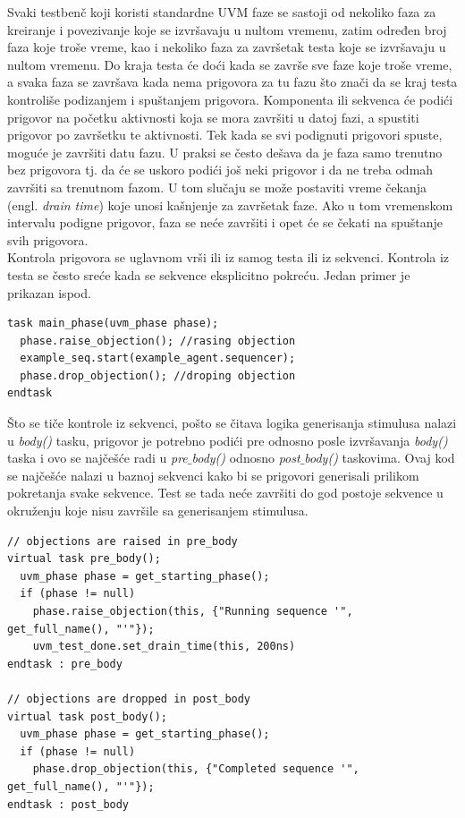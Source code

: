 Svaki testbenč koji koristi standardne UVM faze se sastoji od nekoliko faza za
kreiranje i povezivanje koje se izvršavaju u nultom vremenu, zatim određen broj
faza koje troše vreme, kao i nekoliko faza za završetak testa koje se izvršavaju
u nultom vremenu. Do kraja testa će doći kada se završe sve faze koje troše
vreme, a svaka faza se završava kada nema prigovora za tu fazu što znači da se
kraj testa kontroliše podizanjem i spuštanjem prigovora. Komponenta ili sekvenca
će podići prigovor na početku aktivnosti koja se mora završiti u datoj fazi, a
spustiti prigovor po završetku te aktivnosti. Tek kada se svi podignuti
prigovori spuste, moguće je završiti datu fazu. U praksi se često dešava da je
faza samo trenutno bez prigovora tj. da će se uskoro podići još neki prigovor i
da ne treba odmah završiti sa trenutnom fazom. U tom slučaju se može postaviti
vreme čekanja (engl. \emph{drain time}) koje unosi kašnjenje za završetak faze.
Ako u tom vremenskom intervalu podigne prigovor, faza se neće završiti i opet će
se čekati na spuštanje svih prigovora.\\

Kontrola prigovora se uglavnom vrši ili iz samog testa ili iz sekvenci.
Kontrola iz testa se često sreće kada se sekvence eksplicitno pokreću.
Jedan primer je prikazan ispod.

\begin{lstlisting}
task main_phase(uvm_phase phase);
  phase.raise_objection(); //rasing objection
  example_seq.start(example_agent.sequencer);
  phase.drop_objection(); //droping objection
endtask
\end{lstlisting}

Što se tiče kontrole iz sekvenci, pošto se čitava logika generisanja
stimulusa nalazi u \emph{body()} tasku, prigovor je potrebno podići pre odnosno
posle izvršavanja \emph{body()} taska i ovo se najčešće radi u
\emph{pre\(\_\)body()} odnosno \emph{post\(\_\)body()} taskovima.
Ovaj kod se najčešće nalazi u baznoj sekvenci kako bi se prigovori generisali
prilikom pokretanja svake sekvence.
Test se tada neće završiti do god postoje sekvence u okruženju koje nisu
završile sa generisanjem stimulusa.

\begin{lstlisting}
// objections are raised in pre_body
virtual task pre_body();
  uvm_phase phase = get_starting_phase();
  if (phase != null)
    phase.raise_objection(this, {"Running sequence '", get_full_name(), "'"});
    uvm_test_done.set_drain_time(this, 200ns)
endtask : pre_body

// objections are dropped in post_body
virtual task post_body();
  uvm_phase phase = get_starting_phase();
  if (phase != null)
    phase.drop_objection(this, {"Completed sequence '", get_full_name(), "'"});
endtask : post_body
\end{lstlisting}

